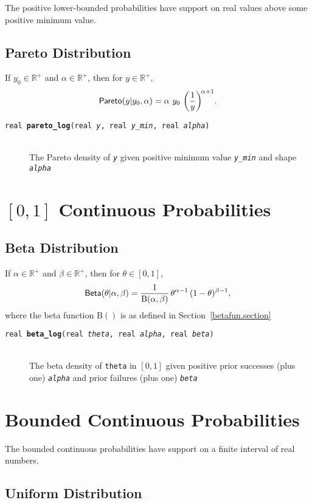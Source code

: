 \documentclass[10pt]{report}
\newcommand{\code}[1]{{\tt #1}}
\newcommand{\distro}[1]{\mbox{\sf #1}}
\newcommand{\Betafun}{\mbox{B}}
\newcommand{\posreals}{\mathbb{R}^+}
\newcommand{\refsection}[1]{Section~\ref{#1.section}}
\newcommand{\fitem}[4]{\item[{\tt #1 {\bfseries #2}(#3)}]\mbox{ } \\[4pt] #4}
\newcommand{\farg}[1]{{\tt\slshape #1}}
\begin{document}
The positive lower-bounded probabilities have support on real values
above some positive minimum value.


\subsection{Pareto Distribution}

If $y_0 \in \posreals$ and $\alpha \in \posreals$, then for
$y \in \posreals$,
\[
\distro{Pareto}(y|y_0,\alpha)
=
\alpha 
\ y_0
\, \left( \frac{1}{y} \right)^{\!\alpha+1}
\! .
\]

\begin{description}
  \fitem{real}{pareto\_log}{real \farg{y}, real \farg{y\_min}, real
    \farg{alpha}}{The Pareto density of \farg{y} given positive minimum
    value \farg{y\_min} and shape \farg{alpha}}
\end{description}



\section{$[0,1]$ Continuous Probabilities}

\subsection{Beta Distribution}

If $\alpha \in \posreals$ and $\beta \in \posreals$, then for $\theta
\in [0,1]$,
\[
\distro{Beta}(\theta|\alpha,\beta)
=
\frac{1}{\Betafun(\alpha,\beta)}
\,
\theta^{\alpha - 1}
\,
(1 - \theta)^{\beta - 1}
,
\] 
where the beta function $\Betafun()$ is as defined in \refsection{betafun}


\begin{description}
%
  \fitem{real}{beta\_log}{real \farg{theta}, real \farg{alpha}, real
    \farg{beta}}{The beta density of \code{theta} in $[0,1]$
    given positive prior successes (plus one)
    \farg{alpha} and prior failures (plus one) \farg{beta}}
%
\end{description}

\section{Bounded Continuous Probabilities}

The bounded continuous probabilities have support on a finite interval
of real numbers.

\subsection{Uniform Distribution}
\end{document}
